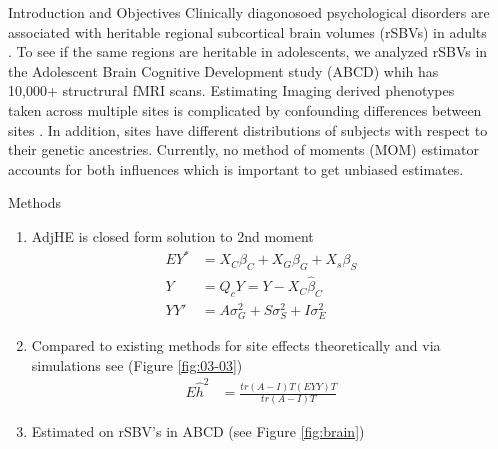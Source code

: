 \documentclass[final]{beamer}
\newlength{\sepwid}
\newlength{\onecolwid}
\begin{document}
\begin{frame}[t] %
\begin{columns}[t] %
\begin{column}{\sepwid}\end{column} %
\begin{column}{\onecolwid} %
\begin{block}{Introduction and Objectives}
Clinically diagonosoed psychological disorders are associated with heritable regional subcortical brain volumes (rSBVs) in adults \cite{koolschijn_brain_2009, zhao_heritability_2019}. To see if the same regions are heritable in adolescents, we analyzed rSBVs in the Adolescent Brain Cognitive Development study (ABCD) whih has 10,000+ structrural fMRI scans. Estimating Imaging derived phenotypes taken across multiple sites is complicated by confounding differences between sites \cite{bayer_site_2022}. In addition, sites have different distributions of subjects with respect to their genetic ancestries. Currently, no method of moments (MOM) estimator accounts for both influences which is important to get unbiased estimates.
\end{block}


\begin{block}{Methods}
\begin{enumerate}
    \item AdjHE is closed form solution to 2nd moment \cite{lin_estimating_2022}
	    \begin{align*}
		    EY^* & = X_C\beta_C + X_G\beta_G + X_s\beta_S \tag{1st Moment}\\
		    Y &= Q_cY = Y - X_C\hat \beta_C \tag{Residualize} \\
		    YY' &= A\sigma_G^2 + S\sigma_S^2 + I\sigma_E^2 \tag{2nd Moment}
	    \end{align*}
    \item Compared to existing methods for site effects theoretically and via simulations see (Figure \ref{fig:03-03})
	    \begin{align*}
		    E\hat h^2 & = \frac{tr(A-I)T(EYY)T}{tr(A-I)T}
	    \end{align*}
    \item Estimated on rSBV's in ABCD (see Figure \ref{fig:brain})
\end{enumerate}


\end{block}
\end{column}
\end{columns}
\end{frame}
\end{document}
